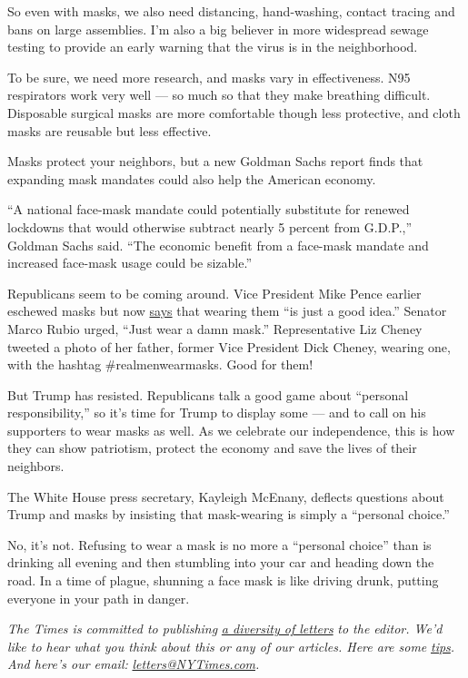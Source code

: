 So even with masks, we also need distancing, hand-washing, contact
tracing and bans on large assemblies. I'm also a big believer in more
widespread sewage testing to provide an early warning that the virus is
in the neighborhood.

To be sure, we need more research, and masks vary in effectiveness. N95
respirators work very well --- so much so that they make breathing
difficult. Disposable surgical masks are more comfortable though less
protective, and cloth masks are reusable but less effective.

Masks protect your neighbors, but a new Goldman Sachs report finds that
expanding mask mandates could also help the American economy.

``A national face-mask mandate could potentially substitute for renewed
lockdowns that would otherwise subtract nearly 5 percent from G.D.P.,''
Goldman Sachs said. ``The economic benefit from a face-mask mandate and
increased face-mask usage could be sizable.''

Republicans seem to be coming around. Vice President Mike Pence earlier
eschewed masks but now
\href{https://abcnews.go.com/Politics/mandatory-mask-rulestrump-insists-personal-choice/story?id=71519019}{says}
that wearing them ``is just a good idea.'' Senator Marco Rubio urged,
``Just wear a damn mask.'' Representative Liz Cheney tweeted a photo of
her father, former Vice President Dick Cheney, wearing one, with the
hashtag \#realmenwearmasks. Good for them!

But Trump has resisted. Republicans talk a good game about ``personal
responsibility,'' so it's time for Trump to display some --- and to call
on his supporters to wear masks as well. As we celebrate our
independence, this is how they can show patriotism, protect the economy
and save the lives of their neighbors.

The White House press secretary, Kayleigh McEnany, deflects questions
about Trump and masks by insisting that mask-wearing is simply a
``personal choice.''

No, it's not. Refusing to wear a mask is no more a ``personal choice''
than is drinking all evening and then stumbling into your car and
heading down the road. In a time of plague, shunning a face mask is like
driving drunk, putting everyone in your path in danger.

\emph{The Times is committed to publishing}
\href{https://www.nytimes3xbfgragh.onion/2019/01/31/opinion/letters/letters-to-editor-new-york-times-women.html}{\emph{a
diversity of letters}} \emph{to the editor. We'd like to hear what you
think about this or any of our articles. Here are some}
\href{https://help.nytimes3xbfgragh.onion/hc/en-us/articles/115014925288-How-to-submit-a-letter-to-the-editor}{\emph{tips}}\emph{.
And here's our email:}
\href{mailto:letters@NYTimes.com}{\emph{letters@NYTimes.com}}\emph{.}


